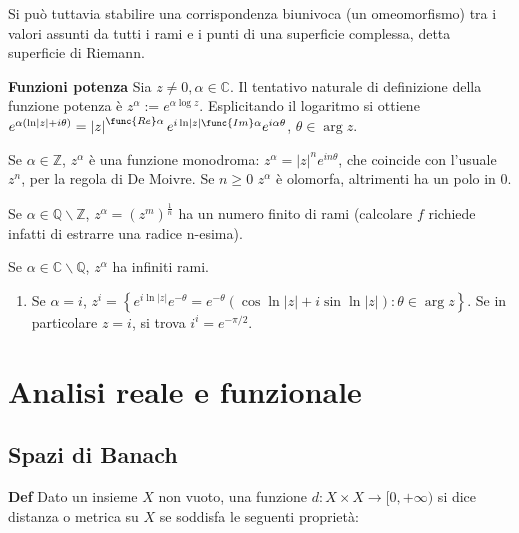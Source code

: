 \documentclass{article}
\begin{document}
Si pu\`{o} tuttavia stabilire una corrispondenza biunivoca (un omeomorfismo)
tra i valori assunti da tutti i rami e i punti di una superficie complessa,
detta superficie di Riemann.

\textbf{Funzioni potenza} Sia $z\neq 0,\alpha \in 
\mathbb{C}
$. Il tentativo naturale di definizione della funzione potenza \`{e} $%
z^{\alpha }:=e^{\alpha \log z}$. Esplicitando il logaritmo si ottiene $%
e^{\alpha \left( \ln \left\vert z\right\vert +i\theta \right) }=\left\vert
z\right\vert ^{\func{Re}\alpha }e^{i\ln \left\vert z\right\vert \func{Im}%
\alpha }e^{i\alpha \theta }$, $\theta \in \arg z$.

Se $\alpha \in 
\mathbb{Z}
$, $z^{\alpha }$ \`{e} una funzione monodroma: $z^{\alpha }=\left\vert
z\right\vert ^{n}e^{in\theta }$, che coincide con l'usuale $z^{n}$, per la
regola di De Moivre. Se $n\geq 0$ $z^{\alpha }$ \`{e} olomorfa, altrimenti
ha un polo in $0$.

Se $\alpha \in 
\mathbb{Q}
\backslash 
\mathbb{Z}
$, $z^{\alpha }=\left( z^{m}\right) ^{\frac{1}{n}}$ ha un numero finito di
rami (calcolare $f$ richiede infatti di estrarre una radice n-esima).

Se $\alpha \in 
\mathbb{C}
\backslash 
\mathbb{Q}
$, $z^{\alpha }$ ha infiniti rami.

\begin{enumerate}
\item Se $\alpha =i$, $z^{i}=\left\{ e^{i\ln \left\vert z\right\vert
}e^{-\theta }=e^{-\theta }\left( \cos \ln \left\vert z\right\vert +i\sin \ln
\left\vert z\right\vert \right) :\theta \in \arg z\right\} $. Se in
particolare $z=i$, si trova $i^{i}=e^{-\pi /2}$.
\end{enumerate}

\section{Analisi reale e funzionale}

\subsection{Spazi di Banach}

\textbf{Def} Dato un insieme $X$ non vuoto, una funzione $d:X\times
X\rightarrow \lbrack 0,+\infty )$ si dice distanza o metrica su $X$ se
soddisfa le seguenti propriet\`{a}:
\end{document}
